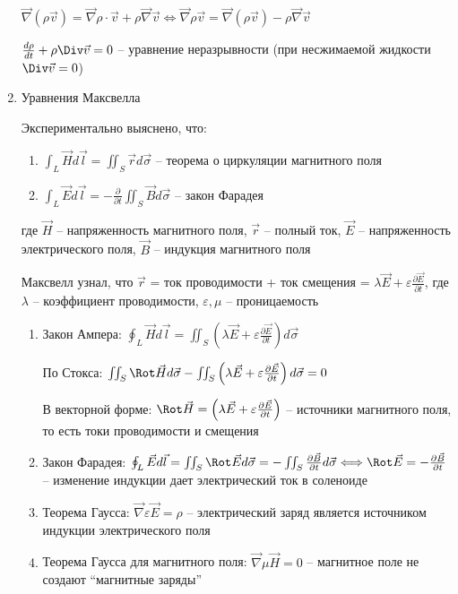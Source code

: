 \documentclass[12pt]{article}
\begin{document}
\begin{enumerate}[label*=\arabic** ]
        $\vec\nabla (\rho \vec{v}) = \vec\nabla \rho \cdot \vec{v} + \rho \vec\nabla \vec{v} \Longleftrightarrow \vec\nabla \rho \vec{v} = \vec\nabla (\rho \vec{v}) - \rho \vec\nabla \vec{v}$

        $\frac{d\rho}{dt} + \rho \Div \vec{v} = 0$ -- уравнение неразрывности (при несжимаемой жидкости $\Div \vec{v} = 0$)

        \item Уравнения Максвелла

        Экспериментально выяснено, что: 
        
        \begin{enumerate}
            \item $\int_L \vec{H} d\vec{l} = \iint_S \vec{r}d\vec{\sigma}$ -- теорема о циркуляции магнитного поля

            \item $\int_L \vec{E} d\vec{l} = -\frac{\partial}{\partial t} \iint_S \vec{B}d\vec{\sigma}$ -- закон Фарадея
        \end{enumerate}

        где $\vec{H}$ -- напряженность магнитного поля, $\vec{r}$ -- полный ток, $\vec{E}$ -- напряженность электрического поля, $\vec{B}$ -- индукция магнитного поля

        Максвелл узнал, что $\vec{r}$ = ток проводимости + ток смещения = $\lambda \vec{E} + \varepsilon \frac{\partial \vec{E}}{\partial t}$, где $\lambda$ -- коэффициент проводимости, $\varepsilon, \mu$ -- проницаемость

        \begin{enumerate}
            \item Закон Ампера: $\oint_L \vec{H} d\vec{l} = \iint_S \left(\lambda \vec{E} + \varepsilon \frac{\partial \vec{E}}{\partial t}\right) d\vec{\sigma}$

            По \Ths Стокса: $\iint_S \Rot \vec{H} d\vec{\sigma} - \iint_S \left(\lambda \vec{E} + \varepsilon \frac{\partial \vec{E}}{\partial t}\right) d\vec{\sigma} = 0$

            В векторной форме: $\Rot \vec{H} = \left(\lambda \vec{E} + \varepsilon \frac{\partial \vec{E}}{\partial t}\right)$ -- источники магнитного поля, то есть токи проводимости и смещения

            \item Закон Фарадея: $\oint_L \vec{E}d\vec{l} = \iint_S \Rot \vec{E}d\vec{\sigma} = -\iint_S \frac{\partial \vec{B}}{\partial t}d\vec{\sigma} \Longleftrightarrow
            \Rot \vec{E} = -\frac{\partial \vec{B}}{\partial t}$ -- изменение индукции дает электрический ток в соленоиде

            \item Теорема Гаусса: $\vec\nabla \varepsilon \vec{E} = \rho$ -- электрический заряд является источником индукции электрического поля

            \item Теорема Гаусса для магнитного поля: $\vec\nabla \mu \vec{H} = 0$ -- магнитное поле не создают \enquote{магнитные заряды}
        \end{enumerate}
    \end{enumerate}
\end{document}
